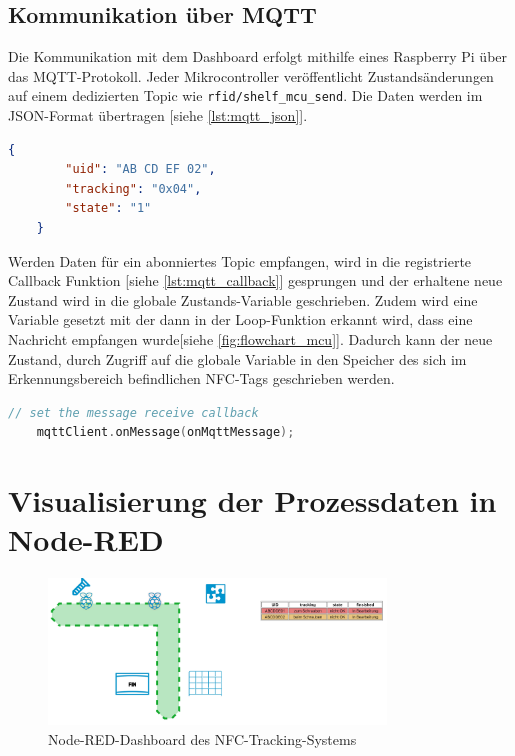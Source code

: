 \newpage

\subsection{Kommunikation über MQTT}

Die Kommunikation mit dem Dashboard erfolgt mithilfe eines Raspberry Pi über das MQTT-Protokoll. Jeder Mikrocontroller veröffentlicht Zustandsänderungen auf einem dedizierten Topic wie \texttt{rfid/shelf\_mcu\_send}. Die Daten werden im JSON-Format übertragen [siehe \autoref{lst:mqtt_json}].

\begin{lstlisting}[language=json, caption={Beispiel einer MQTT JSON Nachricht von der Werkerassistenzstation (0x04: zur Schraubstation, 1: iO) (siehe \autoref{tab:tracking_states})}, label={lst:mqtt_json}]
	{
		"uid": "AB CD EF 02",
		"tracking": "0x04",
		"state": "1"
	}
\end{lstlisting}

Werden Daten für ein abonniertes Topic empfangen, wird in die registrierte Callback Funktion [siehe \autoref{lst:mqtt_callback}] gesprungen und der erhaltene neue Zustand wird in die globale Zustands-Variable geschrieben. Zudem wird eine Variable gesetzt mit der dann in der Loop-Funktion erkannt wird, dass eine Nachricht empfangen wurde[siehe \autoref{fig:flowchart_mcu}]. Dadurch kann der neue Zustand, durch Zugriff auf die globale Variable in den Speicher des sich im Erkennungsbereich befindlichen NFC-Tags geschrieben werden. 

\begin{lstlisting}[language=C, caption={Registrierung des Callbacks in der Setup-Funktion}, label={lst:mqtt_callback}]
	// set the message receive callback
	mqttClient.onMessage(onMqttMessage);
\end{lstlisting}

\section{Visualisierung der Prozessdaten in Node-RED}
\label{sec:Node-Red}

\begin{figure}[H]
	\centering
	\includegraphics[width=0.8\textwidth]{images/node-red-band.jpeg}
	\caption{Node-RED-Dashboard des NFC-Tracking-Systems}
	\label{fig:dashboard}
\end{figure}


